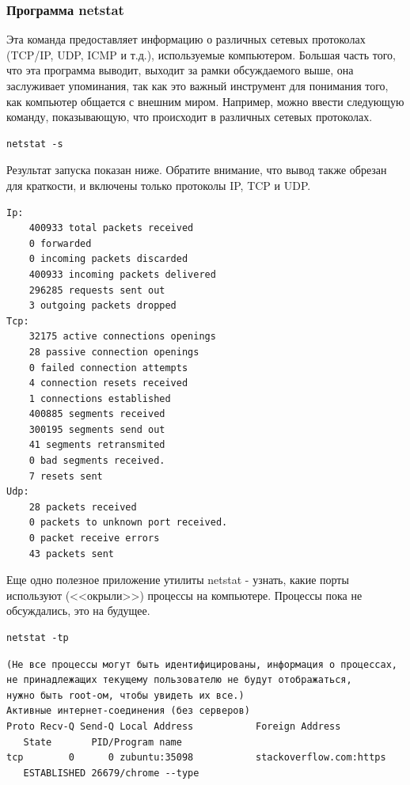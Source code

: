 \documentclass[12pt]{article}
\begin{document}
\hypertarget{netstat}{%
\subsubsection{\texorpdfstring{\protect\hyperlink{netstat}{}Программа
netstat}{Программа netstat}}\label{netstat}}

Эта команда предоставляет информацию о различных сетевых протоколах
(TCP/IP, UDP, ICMP и т.д.), используемые компьютером. Большая часть
того, что эта программа выводит, выходит за рамки обсуждаемого выше, она
заслуживает упоминания, так как это важный инструмент для понимания
того, как компьютер общается с внешним миром. Например, можно ввести
следующую команду, показывающую, что происходит в различных сетевых
протоколах.

\begin{verbatim}
netstat -s
\end{verbatim}

Результат запуска показан ниже. Обратите внимание, что вывод также
обрезан для краткости, и включены только протоколы IP, TCP и UDP.

\begin{verbatim}
Ip:
    400933 total packets received
    0 forwarded
    0 incoming packets discarded
    400933 incoming packets delivered
    296285 requests sent out
    3 outgoing packets dropped
Tcp:
    32175 active connections openings
    28 passive connection openings
    0 failed connection attempts
    4 connection resets received
    1 connections established
    400885 segments received
    300195 segments send out
    41 segments retransmited
    0 bad segments received.
    7 resets sent
Udp:
    28 packets received
    0 packets to unknown port received.
    0 packet receive errors
    43 packets sent
\end{verbatim}

Еще одно полезное приложение утилиты netstat - узнать, какие порты
используют (<<окрыли>>) процессы на компьютере. Процессы пока не
обсуждались, это на будущее.

\begin{verbatim}
netstat -tp
\end{verbatim}

\begin{verbatim}
(Не все процессы могут быть идентифицированы, информация о процессах,
не принадлежащих текущему пользователю не будут отображаться,
нужно быть root-ом, чтобы увидеть их все.)
Активные интернет-соединения (без серверов)
Proto Recv-Q Send-Q Local Address           Foreign Address
   State       PID/Program name
tcp        0      0 zubuntu:35098           stackoverflow.com:https
   ESTABLISHED 26679/chrome --type
\end{verbatim}
\end{document}
